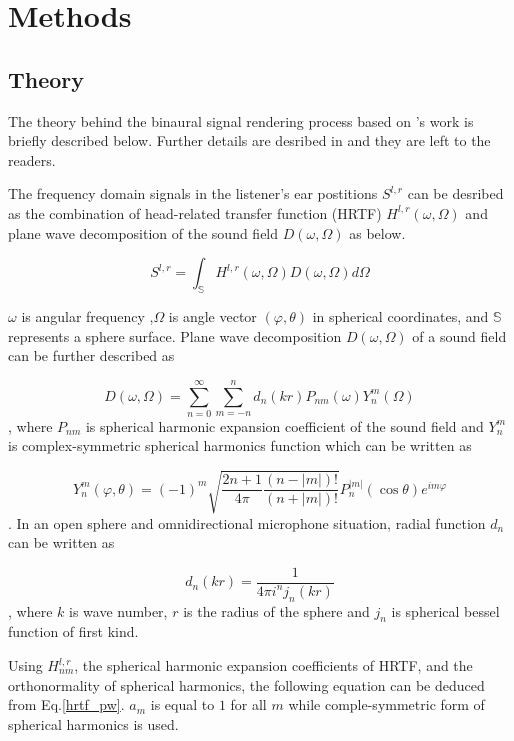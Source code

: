 \documentclass[convention,e-brief]{aesconf-current}
\begin{document}
\section{Methods}

\subsection{Theory}
The theory behind the binaural signal rendering process based on \citet{Andersson2017-qg}'s work is briefly described below.
Further details are desribed in \cite{Andersson2017-qg} and they are left to the readers.

The frequency domain signals in the listener's ear postitions $S^{l, r}$ can be desribed as the combination of head-related transfer function (HRTF) $H^{l, r}(\omega, \Omega)$ and plane wave decomposition of the sound field $D(\omega, \Omega)$ as below.

\begin{equation}
    \label{hrtf_pw}
    S^{l, r}=\int_{\mathbb{S}} H^{l, r}(\omega, \Omega) D(\omega, \Omega) d \Omega
\end{equation}

$\omega$ is angular frequency ,$\Omega$ is angle vector $(\varphi, \theta)$ in spherical coordinates, and $\mathbb{S}$ represents a sphere surface.
Plane wave decomposition $D(\omega, \Omega)$ of a sound field can be further described as


\begin{equation}
    D\left(\omega, \Omega\right)=\sum_{n=0}^{\infty} \sum_{m=-n}^{n} d_{n}(k r) P_{n m}(\omega) Y_{n}^{m}\left(\Omega\right)
\end{equation}
, where $P_{nm}$ is spherical harmonic expansion coefficient of the sound field and $Y^{m}_n$ is complex-symmetric spherical harmonics function which can be written as

$$
    Y_{n}^{m}(\varphi, \theta) =(-1)^{m} \sqrt{\frac{2 n+1}{4 \pi} \frac{(n-|m|) !}{(n+|m|) !}} P_{n}^{|m|}(\cos \theta) e^{i m \varphi}
$$
.
In an open sphere and omnidirectional microphone situation, radial function $d_n$ can be written as

$$
    d_{n}(kr)=\frac{1}{4 \pi i^{n} j_{n}\left(k r\right)}
$$
, where $k$ is wave number, $r$ is the radius of the sphere and $j_n$ is spherical bessel function of first kind.

Using $H_{nm}^{l,r}$, the spherical harmonic expansion coefficients of HRTF, and the orthonormality of spherical harmonics, the following equation can be deduced from Eq.\ref{hrtf_pw}. $a_{m}$ is equal to $1$ for all $m$ while comple-symmetric form of spherical harmonics is used.
\end{document}
